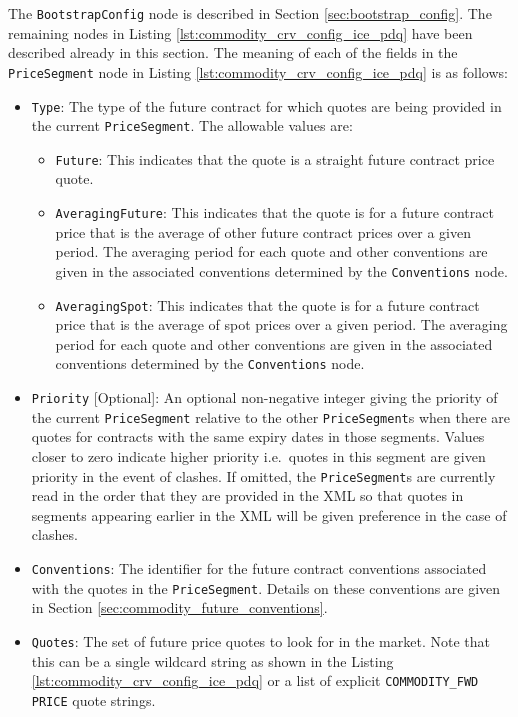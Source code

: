 The \lstinline!BootstrapConfig! node is described in Section \ref{sec:bootstrap_config}. The remaining nodes in Listing \ref{lst:commodity_crv_config_ice_pdq} have been described already in this section. The meaning of each of the fields in the \lstinline!PriceSegment! node in Listing \ref{lst:commodity_crv_config_ice_pdq} is as follows:
\begin{itemize}
\item \lstinline!Type!:
The type of the future contract for which quotes are being provided in the current \lstinline!PriceSegment!. The allowable values are:
    \begin{itemize}
    \item \lstinline!Future!: This indicates that the quote is a straight future contract price quote.
    \item \lstinline!AveragingFuture!: This indicates that the quote is for a future contract price that is the average of other future contract prices over a given period. The averaging period for each quote and other conventions are given in the associated conventions determined by the \lstinline!Conventions! node.
    \item \lstinline!AveragingSpot!: This indicates that the quote is for a future contract price that is the average of spot prices over a given period. The averaging period for each quote and other conventions are given in the associated conventions determined by the \lstinline!Conventions! node.
    \end{itemize}

\item \lstinline!Priority! [Optional]:
An optional non-negative integer giving the priority of the current \lstinline!PriceSegment! relative to the other \lstinline!PriceSegment!s when there are quotes for contracts with the same expiry dates in those segments. Values closer to zero indicate higher priority i.e.\ quotes in this segment are given priority in the event of clashes. If omitted, the \lstinline!PriceSegment!s are currently read in the order that they are provided in the XML so that quotes in segments appearing earlier in the XML will be given preference in the case of clashes.

\item \lstinline!Conventions!:
The identifier for the future contract conventions associated with the quotes in the \lstinline!PriceSegment!. Details on these conventions are given in Section \ref{sec:commodity_future_conventions}.

\item \lstinline!Quotes!:
The set of future price quotes to look for in the market. Note that this can be a single wildcard string as shown in the Listing \ref{lst:commodity_crv_config_ice_pdq} or a list of explicit \lstinline!COMMODITY_FWD! \lstinline!PRICE! quote strings.

\end{itemize}
